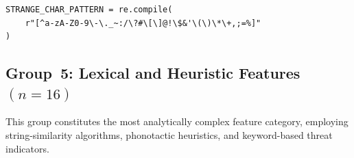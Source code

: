 \documentclass[a4paper,12pt]{article}
\begin{document}
\begin{lstlisting}[caption={Non-standard character detection pattern (RFC 3986 complement)}]
STRANGE_CHAR_PATTERN = re.compile(
    r"[^a-zA-Z0-9\-\._~:/\?#\[\]@!\$&'\(\)\*\+,;=%]"
)
\end{lstlisting}

\subsection{Group~5: Lexical and Heuristic Features \texorpdfstring{$(n=16)$}{(n=16)}}
\label{sec:feat_lexical}

This group constitutes the most analytically complex feature category, employing string-similarity algorithms, phonotactic heuristics, and keyword-based threat indicators.
\end{document}
